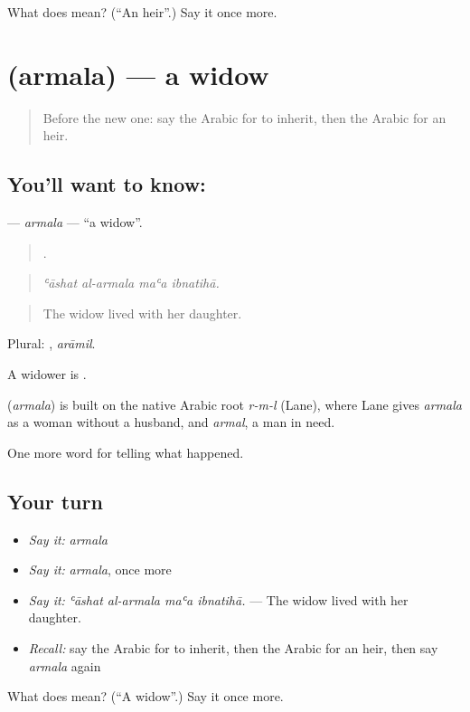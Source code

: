 \begin{tcolorbox}[breakable,colback=teal!4,colframe=teal!35!black,title={Before you move on}]
What does  mean? (\textquotedblleft{}An heir\textquotedblright{}.) Say it once more.
\end{tcolorbox}
\section[\texorpdfstring{\ar{أرملة} (armala)}{أرملة (armala)}]{ (armala) — a widow}

\label{lesson:AR-C337-armala}



\begin{quote}
Before the new one: say the Arabic for to inherit, then the Arabic for an heir.
\end{quote}

\subsection*{You'll want to know: }
\textbf{} — \emph{armala} — \textquotedblleft{}a widow\textquotedblright{}.

\begin{quote}
   .
\end{quote}

\begin{quote}
\emph{ʿāshat al-armala maʿa ibnatihā.}
\end{quote}

\begin{quote}
The widow lived with her daughter.
\end{quote}

Plural: , \emph{arāmil}.

A widower is .

\begin{cousinweb}
\textbf{} (\emph{armala}) is built on the native Arabic root \emph{r-m-l} (Lane), where Lane gives \emph{armala} as a woman without a husband, and \emph{armal}, a man in need.
\end{cousinweb}

\begin{grammarlens}[title={What you've built}]
One more word for telling what happened.
\end{grammarlens}

\subsection*{Your turn}
\begin{itemize}
\raggedright
  \item \emph{Say it:} \emph{armala}
  \item \emph{Say it:} \emph{armala}, once more
  \item \emph{Say it:} \emph{ʿāshat al-armala maʿa ibnatihā.} — The widow lived with her daughter.
  \item \emph{Recall:} say the Arabic for to inherit, then the Arabic for an heir, then say \emph{armala} again
\end{itemize}

\begin{tcolorbox}[breakable,colback=teal!4,colframe=teal!35!black,title={Before you move on}]
What does  mean? (\textquotedblleft{}A widow\textquotedblright{}.) Say it once more.
\end{tcolorbox}
